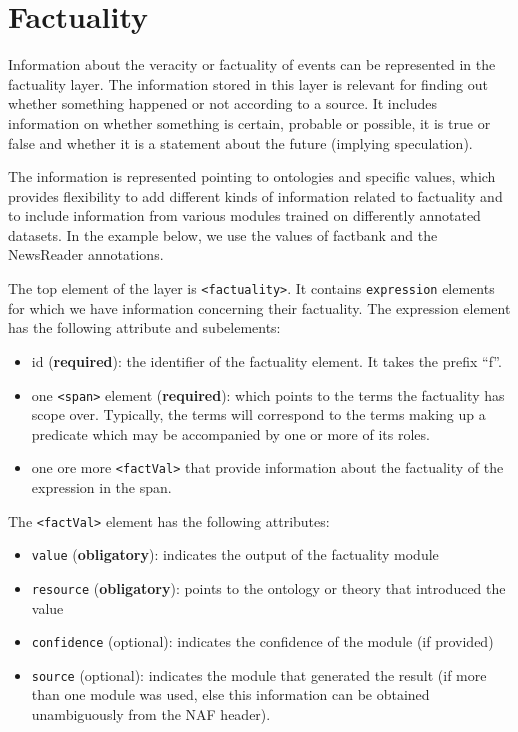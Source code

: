 \section{Factuality}
\label{sec:factuality}

Information about the veracity or factuality of events can be represented in the factuality layer. The information stored in this layer is relevant for finding out whether something happened or not according to a source. It includes information on whether something is certain, probable or possible, it is true or false and whether it is a statement about the future (implying speculation).

The  information is represented pointing to ontologies and specific values, which provides flexibility to add different kinds of information related to factuality and to include information from various modules trained on differently annotated datasets. In the example below, we use the values of factbank and the NewsReader annotations.

The top element of the layer is {\tt <factuality>}. It contains {\tt expression} elements for which we have information concerning their factuality. The expression element has the following attribute and subelements:

\begin{itemize}
\item id (\textbf{required}): the identifier of the factuality element. It takes the prefix ``f''.
\item one {\tt <span>} element (\textbf{required}): which points to the terms the factuality has scope over. Typically, the terms will correspond to the terms making up a predicate which may be accompanied by one or more of its roles. 
\item one ore more {\tt <factVal>} that provide information about the factuality of the expression in the span.
\end{itemize}

The {\tt <factVal>} element has the following attributes:

\begin{itemize}
\item \texttt{value} (\textbf{obligatory}): indicates the output of the factuality module
\item \texttt{resource} (\textbf{obligatory}): points to the ontology or theory that introduced the value
\item \texttt{confidence} (optional): indicates the confidence of the module (if provided)
\item \texttt{source} (optional): indicates the module that generated the result (if more than one module was used, else this information can be obtained unambiguously from the NAF header).
\end{itemize}

